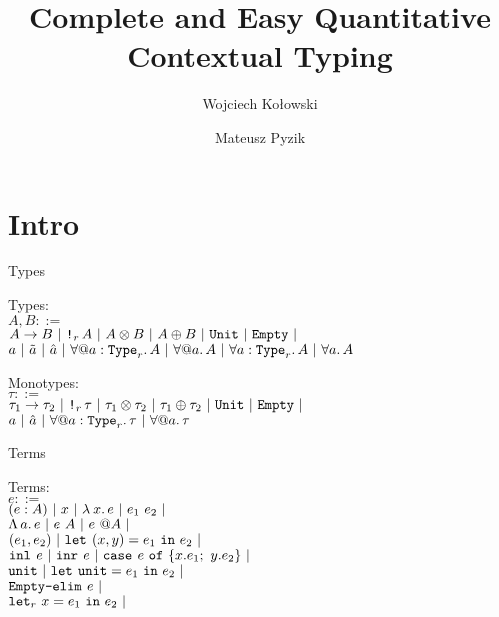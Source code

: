 \documentclass{beamer}
\title{Complete and Easy Quantitative Contextual Typing}
\begin{document}
\maketitle{}
\author
{
  Wojciech Kołowski\\
  \and
  Mateusz Pyzik\\
}
\date{}

\section{Intro}

\begin{frame}{Types}

Types: \\
$A, B ::=$ \\
\qquad $\Fun{A}{B} \pipe \Box[r]{A} \pipe \Prod{A}{B} \pipe \Sum{A}{B} \pipe \Unit \pipe \Empty \pipe$ \\
\qquad $\tvar{a} \pipe \stvar{a} \pipe \evar{a} \pipe \ForallE{a}[r]{A} \pipe \ForallE{a}{A} \pipe \ForallI{a}[r]{A} \pipe \ForallI{a}{A}$

\vspace{2em}

Monotypes: \\
$\tau ::=$ \\
\qquad $\Fun{\tau_1}{\tau_2} \pipe \Box[r]{\tau} \pipe \Prod{\tau_1}{\tau_2} \pipe \Sum{\tau_1}{\tau_2} \pipe \Unit \pipe \Empty \pipe$ \\
\qquad $\tvar{a} \pipe \evar{a} \pipe \ForallE{a}[r]{\tau} \pipe \ForallE{a}{\tau}$

\end{frame}

\begin{frame}{Terms}

Terms: \\
$e ::=$ \\
\qquad $\annot{e}{A} \pipe x \pipe \fun{x}{e} \pipe \app{e_1}{e_2} \pipe$ \\
\qquad $\tfun{a}{e} \pipe \tapp{e}{A} \pipe \itapp{e}{A} \pipe$ \\
\qquad $\pair{e_1}{e_2} \pipe \letpair{x}{y}{e_1}{e_2} \pipe$ \\
\qquad $\inl{e} \pipe \inr{e} \pipe \newcase{e}{x}{e_1}{y}{e_2} \pipe$ \\
\qquad $\unit \pipe \unitelim{e_1}{e_2} \pipe$ \\
\qquad $\emptyelim{e} \pipe$ \\
\qquad $\letin[r]{x}{e_1}{e_2} \pipe$

\end{frame}
\end{document}
